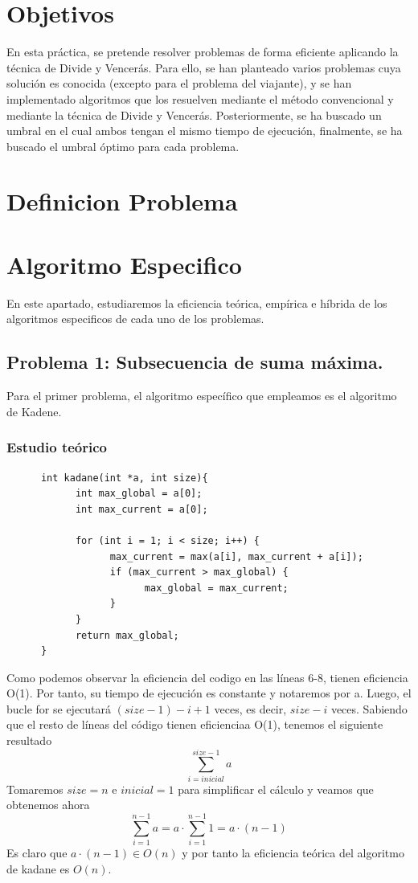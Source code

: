 \documentclass[11pt,openany]{book}
\begin{document}
\chapter{Objetivos}
En esta práctica, se pretende resolver problemas de forma eficiente aplicando la técnica de
Divide y Vencerás. Para ello, se han planteado varios problemas cuya solución es conocida
(excepto para el problema del viajante), y se han implementado algoritmos que los resuelven
mediante el método convencional y mediante la técnica de Divide y Vencerás. Posteriormente, se ha buscado
un umbral en el cual ambos tengan el mismo tiempo de ejecución, finalmente, se ha buscado el
umbral óptimo para cada problema.
\chapter{Definicion Problema}
\chapter{Algoritmo Especifico}
En este apartado, estudiaremos la eficiencia teórica, empírica e híbrida de los algoritmos especificos
de cada uno de los problemas.
\section{Problema 1: Subsecuencia de suma máxima.}
Para el primer problema, el algoritmo específico que empleamos es el algoritmo de Kadene.
\subsection{Estudio teórico}
\begin{lstlisting}
      int kadane(int *a, int size){
            int max_global = a[0];
            int max_current = a[0];

            for (int i = 1; i < size; i++) {
                  max_current = max(a[i], max_current + a[i]);
                  if (max_current > max_global) {
                        max_global = max_current;
                  }
            }
            return max_global;
      }
\end{lstlisting}
Como podemos observar la eficiencia del codigo en las líneas 6-8, tienen eficiencia O(1). Por tanto,
su tiempo de ejecución es constante y notaremos por a. Luego, el bucle for se ejecutará  $(size-1)-i+1 $
veces, es decir, $size-i$ veces. Sabiendo que el resto de líneas del código tienen eficienciaa O(1), tenemos
el siguiente resultado
\begin{equation*}
      \sum_{i=inicial}^{size-1} a
\end{equation*}
Tomaremos $size =  n$ e $inicial = 1$ para simplificar el cálculo y veamos que obtenemos ahora
\begin{equation*}
      \sum_{i=1}^{n-1} a = a \cdot \sum_{i=1}^{n-1} 1= a \cdot (n-1)
\end{equation*}
Es claro que $a \cdot (n-1) \in O(n)$ y por tanto la eficiencia teórica del algoritmo de kadane es $O(n)$.
\end{document}
